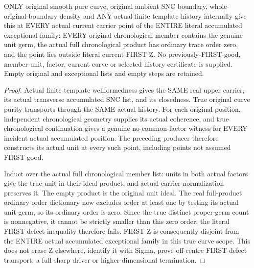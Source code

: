 \begin{theorem}
\label{hir:sharp-original-curve-exceptional-all-residual-units-first-defect-disjoint}
\leanok
ONLY original smooth pure curve, original ambient SNC boundary,
whole-original-boundary density and ANY actual finite template history
internally give this at EVERY actual current carrier point of the ENTIRE
literal accumulated exceptional family: EVERY original chronological
member contains the genuine unit germ, the actual full chronological
product has ordinary trace order zero, and the point lies outside literal
current FIRST Z. No previously-FIRST-good, member-unit, factor, current
curve or selected history certificate is supplied. Empty original and
exceptional lists and empty steps are retained.
\end{theorem}
\begin{proof}
Actual finite template wellformedness gives the SAME real upper carrier,
its actual transverse accumulated SNC list, and its closedness. True
original curve purity transports through the SAME actual history. For
each original position, independent chronological geometry supplies its
actual coherence, and true chronological continuation gives a genuine
no-common-factor witness for EVERY incident actual accumulated position.
The preceding producer therefore constructs its actual unit at every
such point, including points not assumed FIRST-good.

Induct over the actual full chronological member list: units in both
actual factors give the true unit in their ideal product, and actual
carrier normalization preserves it. The empty product is the original
unit ideal. The real full-product ordinary-order dictionary now excludes
order at least one by testing its actual unit germ, so its ordinary order
is zero. Since the true distinct proper-germ count is nonnegative, it
cannot be strictly smaller than this zero order; the literal FIRST-defect
inequality therefore fails. FIRST Z is consequently disjoint from the
ENTIRE actual accumulated exceptional family in this true curve scope.
This does not erase Z elsewhere, identify it with Sigma, prove off-centre
FIRST-defect transport, a full sharp driver or higher-dimensional
termination.
\end{proof}
